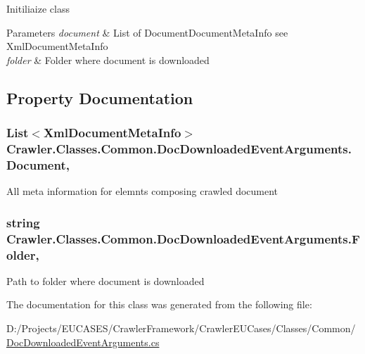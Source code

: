 Initiliaize class 


\begin{DoxyParams}{Parameters}
{\em document} & List of Document\-Document\-Meta\-Info see Xml\-Document\-Meta\-Info\\
\hline
{\em folder} & Folder where document is downloaded\\
\hline
\end{DoxyParams}


\subsection{Property Documentation}
\hypertarget{class_crawler_1_1_classes_1_1_common_1_1_doc_downloaded_event_arguments_ac3b60d9a25c8515b2d4da069a1941918}{
\subsubsection[{Document}]{\setlength{\rightskip}{0pt plus 5cm}List$<${\bf Xml\-Document\-Meta\-Info}$>$ Crawler.\-Classes.\-Common.\-Doc\-Downloaded\-Event\-Arguments.\-Document\hspace{0.3cm}{\ttfamily [get]}, {\ttfamily [set]}}}\label{class_crawler_1_1_classes_1_1_common_1_1_doc_downloaded_event_arguments_ac3b60d9a25c8515b2d4da069a1941918}


All meta information for elemnts composing crawled document 

\hypertarget{class_crawler_1_1_classes_1_1_common_1_1_doc_downloaded_event_arguments_a8395aca64480bf1da4dd34c80b1f94d6}{
\subsubsection[{Folder}]{\setlength{\rightskip}{0pt plus 5cm}string Crawler.\-Classes.\-Common.\-Doc\-Downloaded\-Event\-Arguments.\-Folder\hspace{0.3cm}{\ttfamily [get]}, {\ttfamily [set]}}}\label{class_crawler_1_1_classes_1_1_common_1_1_doc_downloaded_event_arguments_a8395aca64480bf1da4dd34c80b1f94d6}


Path to folder where document is downloaded 



The documentation for this class was generated from the following file\-:\begin{DoxyCompactItemize}
\item 
D\-:/\-Projects/\-E\-U\-C\-A\-S\-E\-S/\-Crawler\-Framework/\-Crawler\-E\-U\-Cases/\-Classes/\-Common/\hyperlink{_doc_downloaded_event_arguments_8cs}{Doc\-Downloaded\-Event\-Arguments.\-cs}\end{DoxyCompactItemize}
